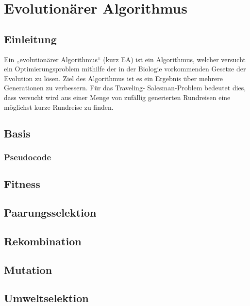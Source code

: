 \chapter{Evolutionärer Algorithmus}
\section{Einleitung}
Ein „evolutionärer Algorithmus“ (kurz EA) ist ein Algorithmus, welcher 
versucht ein Optimierungsproblem mithilfe der in der Biologie 
vorkommenden Gesetze der Evolution zu lösen. Ziel des Algorithmus ist es
ein Ergebnis über mehrere Generationen zu verbessern. Für das Traveling-
Salesman-Problem bedeutet dies, dass versucht wird aus einer Menge
von zufällig generierten Rundreisen eine möglichst kurze Rundreise zu
finden.
\cite{weicker}

\section{Basis}
\subsection{Pseudocode}
\section{Fitness}
\section{Paarungsselektion}
\section{Rekombination}
\section{Mutation}
\section{Umweltselektion}
